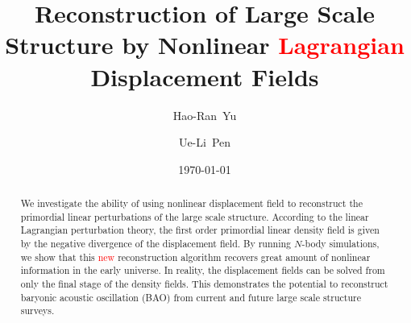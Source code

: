\documentclass[aps,prd,twocolumn,superscriptaddress,amsfont,amssymb,amsmath,nofootinbib,showpacs,balancelastpage]{revtex4-1}
\newcommand{\tcr}{\textcolor{red}}
\begin{document}
\addtolength{\hoffset}{-0.525cm}
\addtolength{\textwidth}{1.05cm}
\title{Reconstruction of Large Scale Structure by Nonlinear \tcr{Lagrangian} Displacement Fields}

\author{Hao-Ran~Yu}%

\author{Ue-Li~Pen}%

\date{\today}

\begin{abstract}
We investigate the ability of using nonlinear displacement field to reconstruct 
the primordial linear perturbations of the large scale structure. According to 
the linear Lagrangian perturbation theory, the first order primordial linear 
density field is given by the negative divergence of the displacement field. By 
running $N$-body simulations, we show that this \tcr{new} reconstruction algorithm recovers 
great amount of nonlinear information in the early universe. In reality, the 
displacement fields can be solved from only the final stage of the density 
fields. This demonstrates the potential to reconstruct baryonic acoustic oscillation (BAO) 
from current and future large scale structure surveys.

\end{abstract}

\end{document}
